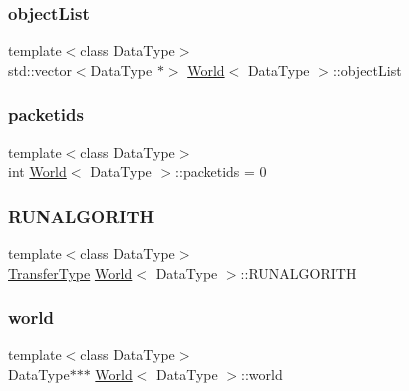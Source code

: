 \hypertarget{class_world_a4a3b31533f61802401a1a624a3bdf3e9}{}\label{class_world_a4a3b31533f61802401a1a624a3bdf3e9} 
\subsubsection{\texorpdfstring{object\+List}{objectList}}
{\footnotesize\ttfamily template$<$class Data\+Type$>$ \\
std\+::vector$<$Data\+Type $\ast$$>$ \hyperlink{class_world}{World}$<$ Data\+Type $>$\+::object\+List\hspace{0.3cm}{\ttfamily [private]}}

\hypertarget{class_world_a6db242c73b23c4df1c6d1702b390864d}{}\label{class_world_a6db242c73b23c4df1c6d1702b390864d} 
\subsubsection{\texorpdfstring{packetids}{packetids}}
{\footnotesize\ttfamily template$<$class Data\+Type$>$ \\
int \hyperlink{class_world}{World}$<$ Data\+Type $>$\+::packetids = 0\hspace{0.3cm}{\ttfamily [private]}}

\hypertarget{class_world_a36829a35bff07a66a3742fa57a1b7e63}{}\label{class_world_a36829a35bff07a66a3742fa57a1b7e63} 
\subsubsection{\texorpdfstring{R\+U\+N\+A\+L\+G\+O\+R\+I\+TH}{RUNALGORITH}}
{\footnotesize\ttfamily template$<$class Data\+Type$>$ \\
\hyperlink{world_8h_ad47f1eda321bcca6916acde6b220d704}{Transfer\+Type} \hyperlink{class_world}{World}$<$ Data\+Type $>$\+::R\+U\+N\+A\+L\+G\+O\+R\+I\+TH}

\hypertarget{class_world_a647a2a9a2645df4a15bd0a4565d689b9}{}\label{class_world_a647a2a9a2645df4a15bd0a4565d689b9} 
\subsubsection{\texorpdfstring{world}{world}}
{\footnotesize\ttfamily template$<$class Data\+Type$>$ \\
Data\+Type$\ast$$\ast$$\ast$ \hyperlink{class_world}{World}$<$ Data\+Type $>$\+::world\hspace{0.3cm}{\ttfamily [private]}}

